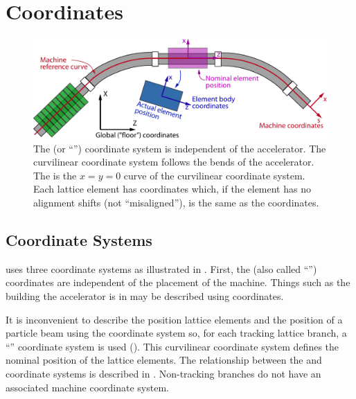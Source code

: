 \chapter{Coordinates}
\label{s:coords}

\begin{figure}[!hb]
  \centering
  \includegraphics[width=5.0in]{coordinates.pdf}
  \caption[The three coordinate system used by \accellat.]
{The  (or ``'') coordinate system
is independent of the accelerator.  The  curvilinear coordinate system follows the bends
of the accelerator. The  is the $x = y = 0$ curve of the curvilinear coordinate
system. Each lattice element has  coordinates which, if the element has no
alignment shifts (not ``misaligned''), is the same as the  coordinates.}
  \label{f:coords}
\end{figure}

\section{Coordinate Systems}
\label{s:coords}
\vspace*{-0.1in}

\accellat uses three coordinate systems as illustrated in . First, the  (also
called ``'') coordinates are independent of the placement of the machine. Things such as the
building the accelerator is in may be described using  coordinates.

It is inconvenient to describe the position lattice elements and the position of a 
particle beam using the  coordinate system so, for each tracking lattice branch,
a ``'' coordinate system is used (). This curvilinear coordinate
system defines the nominal position of the lattice elements. The relationship between the
 and  coordinate systems is described in . Non-tracking branches
do not have an associated machine coordinate system.

